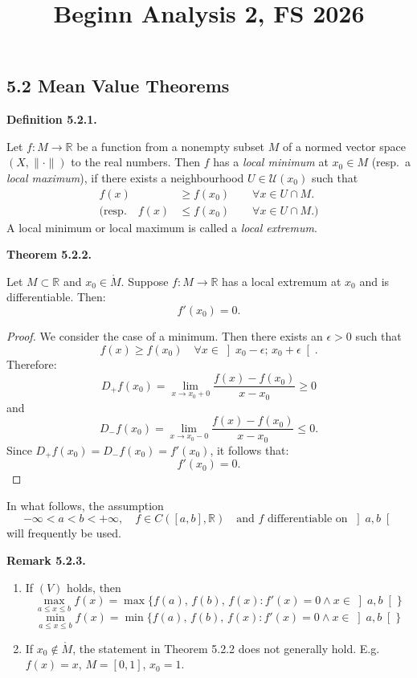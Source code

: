 \documentclass[12pt]{article}
\title{\textbf{Beginn} Analysis 2, FS 2026}
\date{}
\newenvironment{satz}[1]{%
  \par\vspace{6pt}\noindent\textbf{Theorem #1.}\itshape\space
}{%
  \par\vspace{6pt}
}
\newenvironment{definition}[1]{%
  \par\vspace{6pt}\noindent\textbf{Definition #1.}\itshape\space
}{%
  \par\vspace{6pt}
}
\newenvironment{bemerkung}[1]{%
  \par\vspace{6pt}\noindent\textbf{Remark #1.}\itshape\space
}{%
  \par\vspace{6pt}
}
\begin{document}
\maketitle

\subsection{5.2 Mean Value Theorems}


\begin{definition}{5.2.1}
Let $f : M \to \mathbb{R}$ be a function from a nonempty subset $M$ of a normed vector
space $(X, \|\cdot\|)$ to the real numbers. Then $f$ has a \emph{local minimum} at
$x_0 \in M$ (resp.\ a \emph{local maximum}), if there exists a neighbourhood
$U \in \mathcal{U}(x_0)$ such that
\begin{align*}
    f(x) &\geq f(x_0) \qquad \forall x \in U \cap M. \\
    (\text{resp.} \quad f(x) &\leq f(x_0) \qquad \forall x \in U \cap M.)
\end{align*}
A local minimum or local maximum is called a \emph{local extremum}.
\end{definition}

\begin{satz}{5.2.2}
Let $M \subset \mathbb{R}$ and $x_0 \in \mathring{M}$. Suppose $f : M \to \mathbb{R}$
has a local extremum at $x_0$ and is differentiable. Then:
\[
    f'(x_0) = 0.
\]
\end{satz}

\begin{proof}
We consider the case of a minimum. Then there exists an $\epsilon > 0$ such that
\[
    f(x) \geq f(x_0) \quad \forall x \in \left]x_0 - \epsilon;\, x_0 + \epsilon\right[.
\]
Therefore:
\[
    D_+f(x_0) = \lim_{x \to x_0+0} \frac{f(x) - f(x_0)}{x - x_0} \geq 0
\]
and
\[
    D_-f(x_0) = \lim_{x \to x_0-0} \frac{f(x) - f(x_0)}{x - x_0} \leq 0.
\]
Since $D_+f(x_0) = D_-f(x_0) = f'(x_0)$, it follows that:
\[
    f'(x_0) = 0.
\]
\end{proof}

In what follows, the assumption
\[
    -\infty < a < b < +\infty, \quad f \in C([a,b], \mathbb{R})
    \quad \text{and } f \text{ differentiable on } \left]a, b\right[
    \tag{V}
\]
will frequently be used.

\begin{bemerkung}{5.2.3}
\hfill
\begin{enumerate}
    \item If $(V)$ holds, then
    \[
        \max_{a \leq x \leq b} f(x) = \max\{f(a),\, f(b),\, f(x) : f'(x) = 0 \wedge x \in \left]a,b\right[\}
    \]
    \[
        \min_{a \leq x \leq b} f(x) = \min\{f(a),\, f(b),\, f(x) : f'(x) = 0 \wedge x \in \left]a,b\right[\}
    \]

    \item If $x_0 \notin \mathring{M}$, the statement in Theorem 5.2.2 does not generally
    hold. E.g.\ $f(x) = x$, $M = [0,1]$, $x_0 = 1$.
\end{enumerate}
\end{bemerkung}
\end{document}
